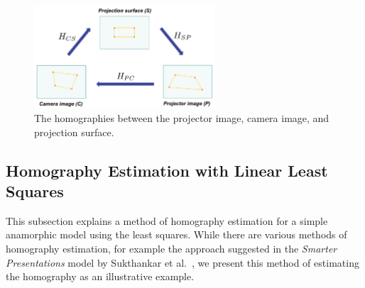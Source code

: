 \documentclass[11pt, oneside, reqno]{book}
\begin{document}
\begin{figure}[h]
	\centering
	\includegraphics[width=0.6\textwidth]{data/schemat/diagram3screens}
	\caption{The homographies between the projector image, camera image, and projection surface.}
	\label{fig:diagram3screens}
\end{figure}




\subsection{Homography Estimation with Linear Least Squares}
\label{ssec:leastSqHomograph}

This subsection explains a method of homography estimation for a simple anamorphic model using the least squares. While there are various methods of homography estimation, for example the approach suggested in the \textit{Smarter Presentations} model by Sukthankar et al.~\cite{sukthankar2001smarter}, we present this method of estimating the homography as an illustrative example. 
\end{document}
